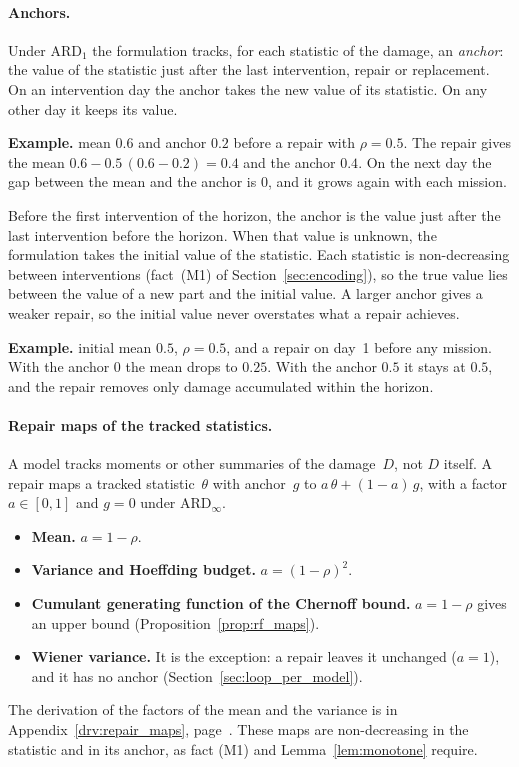 \documentclass[11pt,a4paper]{article}
\theoremstyle{plain}
\theoremstyle{definition}
\theoremstyle{remark}
\begin{document}
\paragraph{Anchors.}
Under $\text{ARD}_1$ the formulation tracks, for each statistic of the damage, an \emph{anchor}: the value of the statistic just after the last intervention, repair or replacement.
On an intervention day the anchor takes the new value of its statistic.
On any other day it keeps its value.

\begin{examplebox}
\textbf{Example.} mean $0.6$ and anchor $0.2$ before a repair with $\rho = 0.5$.
The repair gives the mean $0.6 - 0.5\,(0.6 - 0.2) = 0.4$ and the anchor $0.4$.
On the next day the gap between the mean and the anchor is $0$, and it grows again with each mission.
\end{examplebox}

Before the first intervention of the horizon, the anchor is the value just after the last intervention before the horizon.
When that value is unknown, the formulation takes the initial value of the statistic.
Each statistic is non-decreasing between interventions (fact~(M1) of Section~\ref{sec:encoding}), so the true value lies between the value of a new part and the initial value.
A larger anchor gives a weaker repair, so the initial value never overstates what a repair achieves.

\begin{examplebox}
\textbf{Example.} initial mean $0.5$, $\rho = 0.5$, and a repair on day~1 before any mission.
With the anchor $0$ the mean drops to $0.25$.
With the anchor $0.5$ it stays at $0.5$, and the repair removes only damage accumulated within the horizon.
\end{examplebox}

\paragraph{Repair maps of the tracked statistics.}
A model tracks moments or other summaries of the damage~$D$, not $D$ itself.
A repair maps a tracked statistic~$\theta$ with anchor~$g$ to $a\,\theta + (1-a)\,g$, with a factor $a \in [0,1]$ and $g = 0$ under $\text{ARD}_\infty$.
\begin{itemize}
  \item \textbf{Mean.} $a = 1-\rho$.
  \item \textbf{Variance and Hoeffding budget.} $a = (1-\rho)^2$.
  \item \textbf{Cumulant generating function of the Chernoff bound.} $a = 1-\rho$ gives an upper bound (Proposition~\ref{prop:rf_maps}).
  \item \textbf{Wiener variance.} It is the exception: a repair leaves it unchanged ($a = 1$), and it has no anchor (Section~\ref{sec:loop_per_model}).
\end{itemize}
The derivation of the factors of the mean and the variance is in Appendix~\ref{drv:repair_maps}, page~\pageref{drv:repair_maps}.
These maps are non-decreasing in the statistic and in its anchor, as fact (M1) and Lemma~\ref{lem:monotone} require.
\end{document}
